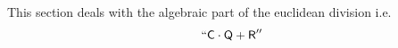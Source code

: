 This section deals with the algebraic part of the euclidean division i.e.
\[
	``\textsf{C} \cdot \textsf{Q} + \textsf{R}''
\]

